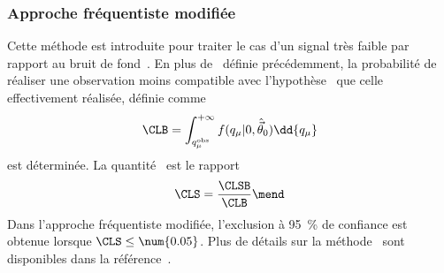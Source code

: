 \subsubsection{Approche fréquentiste modifiée}
Cette méthode est introduite pour traiter le cas d'un signal très faible par rapport au bruit de fond~\cite{Junk:1999kv,CLs_method,Read_2002}.
En plus de \CLSB\ définie précédemment,
la probabilité de réaliser une observation moins compatible avec l'hypothèse \hypB\ que celle effectivement réalisée, définie comme
\begin{equation}
\CLB = \int_{q_{\mu}^\text{obs}}^{+\infty} f (q_\mu | 0, \hat{\vec{\theta}}_0) \dd{q_\mu}
\end{equation}
est déterminée.
La quantité \CLS\ est le rapport
\begin{equation}
\CLS = \frac{\CLSB}{\CLB}
\mend
\end{equation}
Dans l'approche fréquentiste modifiée, l'exclusion à \SI{95}{\%} de confiance est obtenue lorsque $\CLS \leq \num{0.05}$.
Plus de détails sur la méthode \CLS\ sont disponibles dans la référence~\cite{CMS-NOTE-2011-005}.